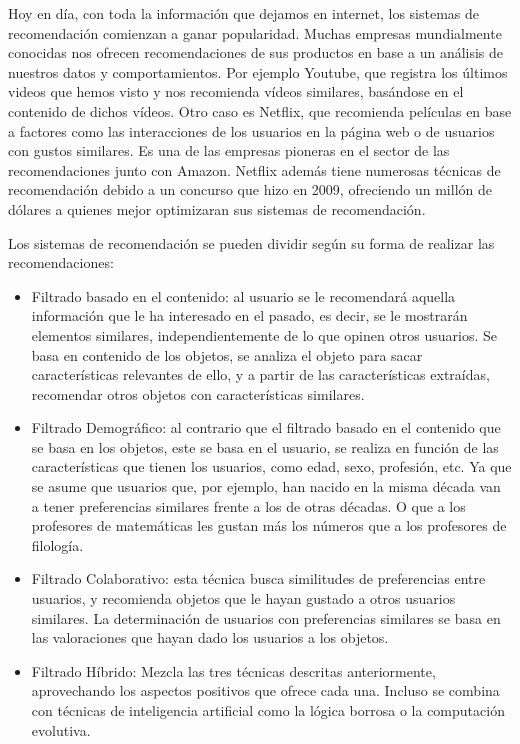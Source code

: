 Hoy en día, con toda la información que dejamos en internet, los sistemas de recomendación comienzan a ganar popularidad.
Muchas empresas mundialmente conocidas nos ofrecen recomendaciones de sus productos en base a un análisis de nuestros datos y comportamientos.
Por ejemplo Youtube, que registra los últimos videos que hemos visto y nos recomienda vídeos similares, basándose en el contenido de dichos vídeos. Otro caso es Netflix, que recomienda películas 
en base a factores como las interacciones de los usuarios en la página web o de usuarios con gustos similares\cite{netflixrecommendation}. Es una de las empresas pioneras en el sector 
de las recomendaciones junto con Amazon. Netflix además tiene numerosas técnicas de recomendación debido a un concurso 
que hizo en 2009, ofreciendo un millón de dólares a quienes mejor optimizaran sus sistemas de recomendación\cite{netflixprize}.

Los sistemas de recomendación se pueden dividir según su forma de realizar las recomendaciones:

\begin{itemize}
    \item Filtrado basado en el contenido\cite{filtradocontenido}: al usuario se le recomendará aquella información que le ha interesado en el pasado, es decir, se le mostrarán elementos similares, independientemente de lo que opinen otros usuarios. 
    Se basa en contenido de los objetos, se analiza el objeto para sacar características relevantes de ello, y a partir de las características 
    extraídas, recomendar otros objetos con características similares.   
    \item Filtrado Demográfico\cite{filtrademografico}: al contrario que el filtrado basado en el contenido que se basa en los objetos, este se basa en el usuario,
    se realiza en función de las características que tienen los usuarios, como edad, sexo, profesión, etc. Ya que se asume que usuarios que, por ejemplo,
    han nacido en la misma década van a tener preferencias similares frente a los de otras décadas. O que a los profesores de matemáticas les gustan más los números 
    que a los profesores de filología. 
    \item Filtrado Colaborativo\cite{filtradocolaborativo}: esta técnica busca similitudes de preferencias entre usuarios, y recomienda objetos 
    que le hayan gustado a otros usuarios similares. La determinación de usuarios con preferencias similares se basa en 
    las valoraciones que hayan dado los usuarios a los objetos.
    \item Filtrado Híbrido\cite{filtrahibrido}: Mezcla las tres técnicas descritas anteriormente, aprovechando los aspectos positivos
    que ofrece cada una. Incluso se combina con técnicas de inteligencia artificial como la lógica borrosa o la computación evolutiva. 
\end{itemize} 

